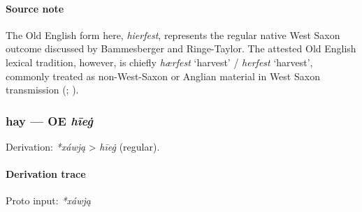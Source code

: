 \documentclass[
  british,
  a4paper,
]{article}
\begin{document}
\paragraph{Source note}\label{source-note-3}

The Old English form here, \emph{hierfest}, represents the regular
native West Saxon outcome discussed by Bammesberger and Ringe-Taylor.
The attested Old English lexical tradition, however, is chiefly
\emph{hærfest} `harvest' / \emph{herfest} `harvest', commonly treated as
non-West-Saxon or Anglian material in West Saxon transmission
(;
).

\subsubsection{\texorpdfstring{hay --- OE
\emph{hīeġ}}{hay --- OE hīeġ}}\label{hay-oe-hux12beux121}

Derivation: \emph{*xáwją} \textgreater{} \emph{hīeġ} (regular).

\paragraph{Derivation trace}\label{derivation-trace-40}

Proto input: \emph{*xáwją}

\begingroup
\setlength{\fboxsep}{6pt}
\end{document}
